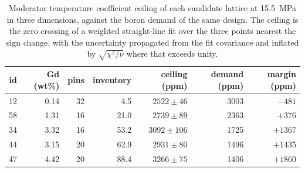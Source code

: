 \begin{table}[htbp]
  \centering
  \caption[Boron ceiling of each candidate lattice]{Moderator temperature coefficient ceiling of each candidate lattice at \SI{15.5}{MPa} in three dimensions, against the boron demand of the same design. The ceiling is the zero crossing of a weighted straight-line fit over the three points nearest the sign change, with the uncertainty propagated from the fit covariance and inflated by $\sqrt{\chi^2/\nu}$ where that exceeds unity.}
  \label{tab:c9-ceilings}
  \begin{tabular}{rrrrrrr}
    \toprule
    id & Gd (wt\%) & pins & inventory & ceiling (ppm) & demand (ppm) & margin (ppm) \\
    \midrule
    12 & 0.14 & 32 & 4.5 & $2522 \pm 46$ & 3003 & $-481$ \\
    58 & 1.31 & 16 & 21.0 & $2739 \pm 89$ & 2363 & $+376$ \\
    34 & 3.32 & 16 & 53.2 & $3092 \pm 106$ & 1725 & $+1367$ \\
    44 & 3.15 & 20 & 62.9 & $2931 \pm 80$ & 1496 & $+1435$ \\
    47 & 4.42 & 20 & 88.4 & $3266 \pm 75$ & 1406 & $+1860$ \\
    \bottomrule
  \end{tabular}
\end{table}
